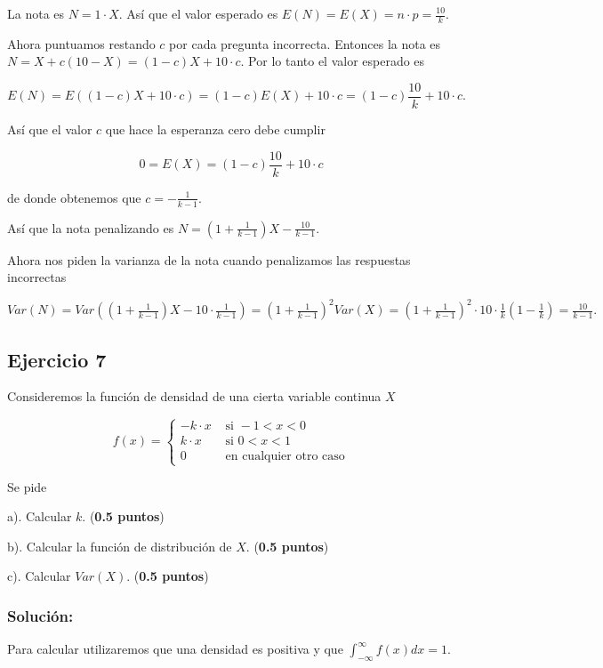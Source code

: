 \documentclass[
]{article}
\begin{document}
La nota es \(N=1\cdot X\). Así que el valor esperado es
\(E(N)=E(X)=n\cdot p=\frac{10}{k}.\)

Ahora puntuamos restando \(c\) por cada pregunta incorrecta. Entonces la
nota es \(N=X+c (10-X)=(1-c) X+10\cdot c\). Por lo tanto el valor
esperado es

\[E(N)=E((1-c) X+10\cdot  c)=(1-c) E(X)+10\cdot c=(1-c)\frac{10}{k}+10\cdot c.\]

Así que el valor \(c\) que hace la esperanza cero debe cumplir

\[0=E(X)=(1-c)\frac{10}{k}+10\cdot c\]

de donde obtenemos que \(c=-\frac{1}{k-1}\).

Así que la nota penalizando es
\(N=\left(1+\frac{1}{k-1}\right) X-\frac{10}{k-1}.\)

Ahora nos piden la varianza de la nota cuando penalizamos las respuestas
incorrectas

\(Var(N)=Var\left(\left(1+\frac{1}{k-1}\right) X-10\cdot\frac{1}{k-1}\right)=\left(1+\frac{1}{k-1}\right)^2 Var(X)= \left(1+\frac{1}{k-1}\right)^2\cdot 10\cdot \frac{1}{k} \left(1-\frac{1}{k}\right)=\frac{10}{k-1}.\)

\hypertarget{ejercicio-7}{%
\subsection{Ejercicio 7}\label{ejercicio-7}}

Consideremos la función de densidad de una cierta variable continua
\(X\)

\[f(x)=\left\{
\begin{array}{cr}
-k\cdot x & \mbox{ si } -1<x<0\\
k\cdot x & \mbox{ si }  0<x<1\\
0 & \mbox{ en cualquier otro caso}
\end{array}
\right.
\]

Se pide

a). Calcular \(k\). (\textbf{0.5 puntos})

b). Calcular la función de distribución de \(X\). (\textbf{0.5 puntos})

c). Calcular \(Var(X)\). (\textbf{0.5 puntos})

\hypertarget{soluciuxf3n-6}{%
\subsubsection{Solución:}\label{soluciuxf3n-6}}

Para calcular utilizaremos que una densidad es positiva y que
\(\int_{-\infty}^{\infty} f(x) dx=1\).
\end{document}
